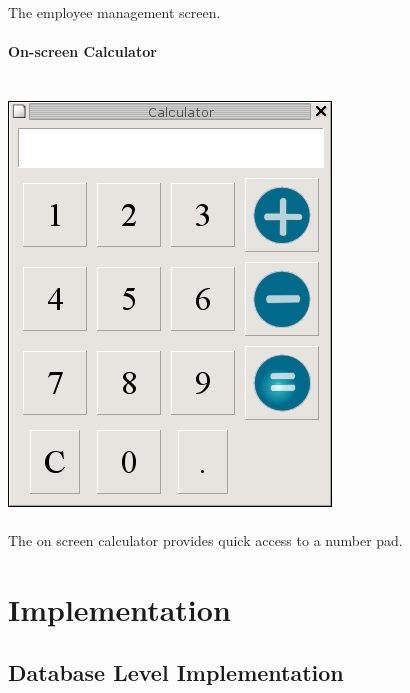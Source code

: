 \documentclass{report}
\begin{document}
\\
The employee management screen.\\
\\
{\bf On-screen Calculator}\\
\\
\\
\includegraphics{ys_calc_screener.png}\\
\\
The on screen calculator provides quick access to a number pad.


\chapter{Implementation}

    \section{Database Level Implementation}
\end{document}
